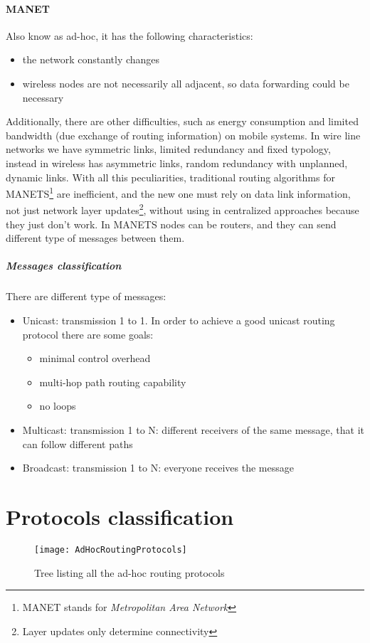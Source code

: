 \paragraph*{MANET} Also know as ad-hoc, it has the following characteristics:
\begin{itemize}
\item the network constantly changes
\item wireless nodes are not necessarily all adjacent, so data forwarding
  could be necessary
\end{itemize}
Additionally, there are other difficulties, such as energy consumption and
limited bandwidth (due exchange of routing information) on mobile systems. In
wire line networks we have symmetric links, limited redundancy and fixed
typology, instead in wireless has asymmetric links, random redundancy with
unplanned, dynamic links. With all this peculiarities, traditional routing
algorithms for MANETS\footnote{MANET stands for \textit{Metropolitan Area
    Network}} are inefficient, and the new one must rely on data link
information, not just network layer updates\footnote{Layer updates only
  determine connectivity}, without using in centralized approaches because they
just don't work. In MANETS nodes can be routers, and they can send different
type of messages between them.
\subparagraph*{Messages classification} There are different type of messages:
\begin{itemize}
\item Unicast: transmission 1 to 1. In order to achieve a good unicast routing
  protocol there are some goals:
  \begin{itemize}
  \item minimal control overhead
  \item multi-hop path routing capability
  \item no loops
  \end{itemize}
\item Multicast: transmission 1 to N: different receivers of the same message,
  that it can follow different paths
\item Broadcast: transmission 1 to N: everyone receives the message
\end{itemize}

\section{Protocols classification}

\begin{figure}[t]
  \centering
  \texttt{[image: AdHocRoutingProtocols]}
  \caption{Tree listing all the ad-hoc routing protocols}
  \label{fig:mac:adHocRoutingProtocols}
\end{figure}

